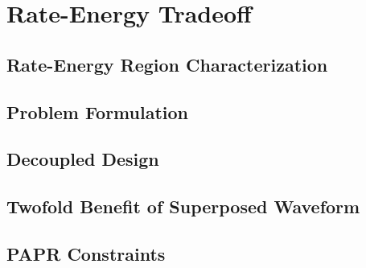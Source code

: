 \chapter{Rate-Energy Tradeoff}



\section{Rate-Energy Region Characterization}\label{sec:rate-energy-region-characterization}
  

\section{Problem Formulation}\label{sec:problem-formulation}
  

\section{Decoupled Design}\label{sec:decoupled-design}
  

\section{Twofold Benefit of Superposed Waveform}\label{sec:twofold-benefit-of-superposed-waveform}
  

\section{PAPR Constraints}\label{sec:papr-constraints}
  